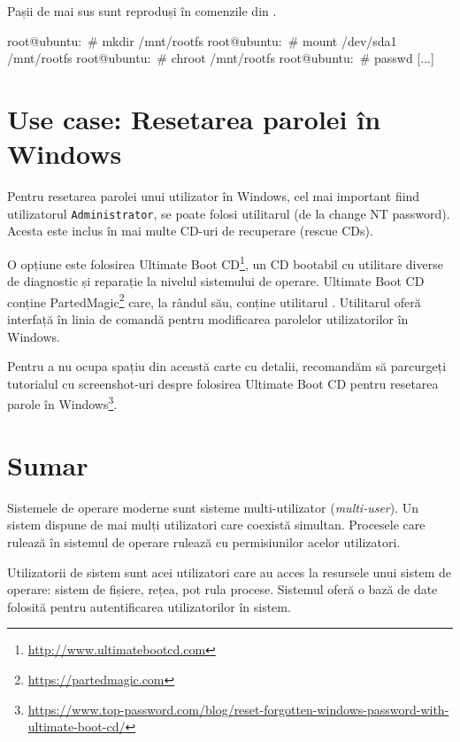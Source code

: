Pașii de mai sus sunt reproduși în comenzile din .

\begin{screen}[caption={Resetarea parolei contului root cu live CD},label={lst:user:pw-reset-live-cd}]
root@ubuntu:~# mkdir /mnt/rootfs
root@ubuntu:~# mount /dev/sda1 /mnt/rootfs
root@ubuntu:~# chroot /mnt/rootfs
root@ubuntu:~# passwd
[...]
\end{screen}

\section{Use case: Resetarea parolei în Windows}
\label{sec:user:windows-password-recovery}

Pentru resetarea parolei unui utilizator în Windows, cel mai important fiind
utilizatorul \texttt{Administrator}, se poate folosi utilitarul  (de la change NT
password). Acesta este inclus în mai multe CD-uri de recuperare (rescue CDs).

O opțiune este folosirea Ultimate Boot
CD\footnote{\url{http://www.ultimatebootcd.com}}, un CD bootabil cu utilitare
diverse de diagnostic și reparație la nivelul sistemului de operare. Ultimate
Boot CD conține PartedMagic\footnote{\url{https://partedmagic.com}} care, la
rândul său, conține utilitarul . Utilitarul  oferă interfață în
linia de comandă pentru modificarea parolelor utilizatorilor în Windows.

Pentru a nu ocupa spațiu din această carte cu detalii, recomandăm să parcurgeți
tutorialul cu screenshot-uri despre folosirea Ultimate Boot CD pentru resetarea parole în Windows\footnote{\url{https://www.top-password.com/blog/reset-forgotten-windows-password-with-ultimate-boot-cd/}}.

\section{Sumar}
\label{sec:user:summary}

Sistemele de operare moderne sunt sisteme multi-utilizator (\textit{multi-user}). Un sistem dispune de mai mulți utilizatori care coexistă simultan. Procesele care rulează în sistemul de operare rulează cu permisiunilor acelor utilizatori.

Utilizatorii de sistem sunt acei utilizatori care au acces la resursele unui sistem de operare: sistem de fișiere, rețea, pot rula procese. Sistemul oferă o bază de date folosită pentru autentificarea utilizatorilor în sistem.

